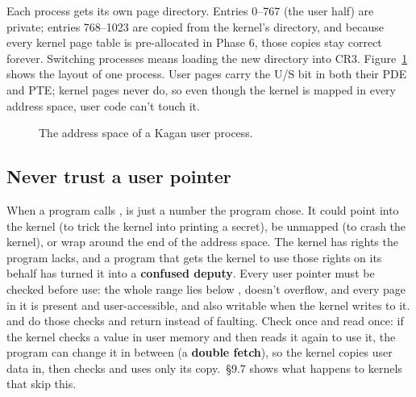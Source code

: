 \documentclass[11pt,a4paper]{article}
\begin{document}
Each process gets its own page directory. Entries 0--767 (the user half) are private; entries 768--1023 are copied
from the kernel's directory, and because every kernel page table is pre-allocated in Phase 6, those copies stay
correct forever. Switching processes means loading the new directory into CR3. Figure~\ref{fig:uas} shows the layout
of one process. User pages carry the U/S bit in both their PDE and PTE; kernel pages never do, so even though the
kernel is mapped in every address space, user code can't touch it.

\begin{figure}[htbp]
\centering
{}
\caption{The address space of a Kagan user process.}
\label{fig:uas}
\end{figure}

\subsection{Never trust a user pointer}

When a program calls ,  is just a number the program chose. It could point into
the kernel (to trick the kernel into printing a secret), be unmapped (to crash the kernel), or wrap around the end of
the address space. The kernel has rights the program lacks, and a program that gets the kernel to use those rights on
its behalf has turned it into a \textbf{confused deputy}. Every user pointer must be checked before use: the whole
range lies below , doesn't overflow, and every page in it is present and user-accessible, and also
writable when the kernel writes to it.  and  do those checks and return
 instead of faulting. Check once and read once: if the kernel checks a value in user memory and then
reads it again to use it, the program can change it in between (a \textbf{double fetch}), so the kernel copies user
data in, then checks and uses only its copy. \MOS\,\S9.7 shows what happens to kernels that skip this.
\end{document}
